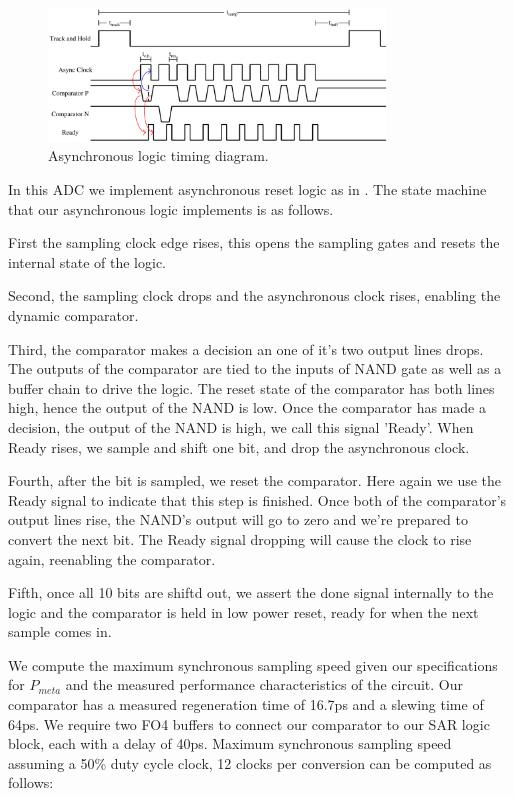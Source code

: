 \documentclass[10pt,journal]{IEEEtran}\usepackage{longtable}
\begin{document}
\begin{figure}[tb]
\begin{center}
\includegraphics[width=0.8\textwidth]{TimingDiagram.pdf}
\caption{Asynchronous logic timing diagram.}
\label{fig:TimingDiagram}
\end{center}
\end{figure}

In this ADC we implement asynchronous reset logic as in \cite{Chen:2006}. The state machine that our asynchronous logic implements is as follows.

First the sampling clock edge rises, this opens the sampling gates and resets the internal state of the logic.

Second, the sampling clock drops and the asynchronous clock rises, enabling the dynamic comparator.

Third, the comparator makes a decision an one of it's two output lines drops. 
The outputs of the comparator are tied to the inputs of NAND gate as well as a buffer chain to drive the logic.
The reset state of the comparator has both lines high, hence the output of the NAND is low.
Once the comparator has made a decision, the output of the NAND is high, we call this signal 'Ready'. When Ready rises, we sample and shift one bit, and drop the asynchronous clock.

Fourth, after the bit is sampled, we reset the comparator. Here again we use the Ready signal to indicate that this step is finished. Once both of the comparator's output lines rise, the NAND's output will go to zero and we're prepared to convert the next bit. The Ready signal dropping will cause the clock to rise again, reenabling the comparator.

Fifth, once all 10 bits are shiftd out, we assert the done signal internally to the logic and the comparator is held in low power reset, ready for when the next sample comes in.

We compute the maximum synchronous sampling speed given our specifications for $P_{meta}$ and the measured performance characteristics of the circuit. Our comparator has a measured regeneration time of 16.7ps and a slewing time of 64ps. We require two FO4 buffers to connect our comparator to our SAR logic block, each with a delay of 40ps. Maximum synchronous sampling speed assuming a 50\% duty cycle clock, 12 clocks per conversion can be computed as follows:
\end{document}
